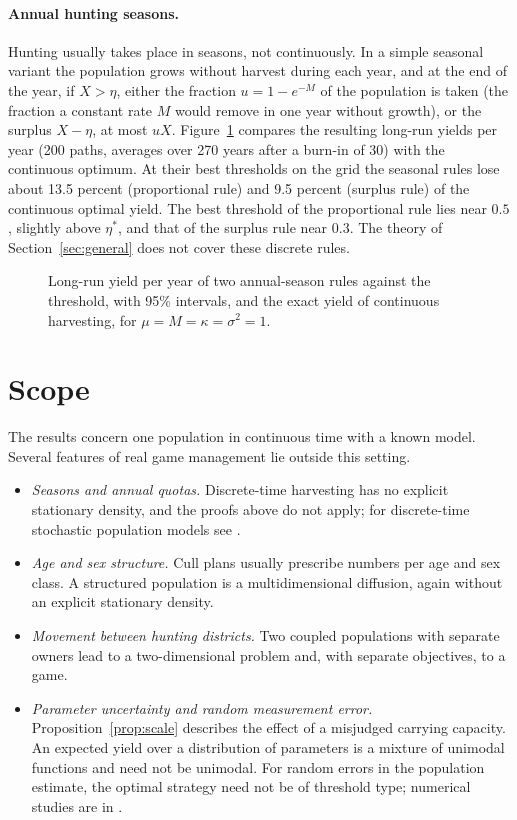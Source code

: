 \documentclass[11pt]{article}
\theoremstyle{definition}
\begin{document}
\paragraph{Annual hunting seasons.}
Hunting usually takes place in seasons, not continuously. In a simple seasonal variant the population grows
without harvest during each year, and at the end of the year, if $X > \eta$, either the fraction
$u = 1 - e^{-M}$ of the population is taken (the fraction a constant rate $M$ would remove in one year without
growth), or the surplus $X - \eta$, at most $uX$. Figure~\ref{fig:seasons} compares the resulting long-run yields
per year (200 paths, averages over 270 years after a burn-in of 30) with the continuous optimum. At their best
thresholds on the grid the seasonal rules lose about 13.5 percent (proportional rule) and 9.5 percent (surplus rule)
of the continuous optimal yield. The best threshold of the
proportional rule lies near $0.5$, slightly above $\eta^*$, and that of the surplus rule near $0.3$. The theory of Section~\ref{sec:general} does not cover these discrete rules.

\begin{figure}[t]
\centering

\caption{Long-run yield per year of two annual-season rules against the threshold, with 95\% intervals, and the
exact yield of continuous harvesting, for $\mu = M = \kappa = \sigma^2 = 1$.}
\label{fig:seasons}
\end{figure}

\section{Scope}\label{sec:scope}

The results concern one population in continuous time with a known model. Several features of real game
management lie outside this setting.
\begin{itemize}
\item \emph{Seasons and annual quotas.} Discrete-time harvesting has no explicit stationary density, and the
proofs above do not apply; for discrete-time stochastic population models see \cite{hening21}.
\item \emph{Age and sex structure.} Cull plans usually prescribe numbers per age and sex class. A structured
population is a multidimensional diffusion, again without an explicit stationary density.
\item \emph{Movement between hunting districts.} Two coupled populations with separate owners lead to a
two-dimensional problem and, with separate objectives, to a game.
\item \emph{Parameter uncertainty and random measurement error.} Proposition~\ref{prop:scale} describes the
effect of a misjudged carrying capacity. An expected yield over a distribution of parameters is a mixture of
unimodal functions and need not be unimodal. For random errors in the population estimate, the optimal strategy
need not be of threshold type; numerical studies are in \cite{memarzadeh18}.
\end{itemize}
\end{document}

